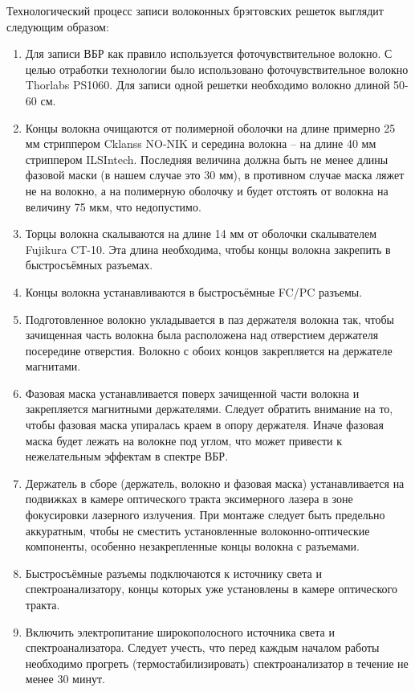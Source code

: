 Технологический процесс записи волоконных брэгговских решеток выглядит следующим образом:
\begin{enumerate}
    \item Для записи ВБР как правило используется фоточувствительное волокно. С целью отработки технологии было использовано фоточувствительное волокно Thorlabs PS1060. Для записи одной решетки необходимо волокно длиной 50-60 см.
    \item Концы волокна очищаются от полимерной оболочки на длине примерно 25 мм стриппером Cklanss NO-NIK и середина волокна – на длине 40 мм стриппером ILSIntech. Последняя величина должна быть не менее длины фазовой маски (в нашем случае это 30 мм), в противном случае маска ляжет не на волокно, а на полимерную оболочку и будет отстоять от волокна на величину 75 мкм, что недопустимо.
    \item Торцы волокна скалываются на длине 14 мм от оболочки скалывателем Fujikura CT-10. Эта длина необходима, чтобы концы волокна закрепить в быстросъёмных разъемах.
    \item Концы волокна устанавливаются в быстросъёмные FC/PC разъемы.
    \item Подготовленное волокно укладывается в паз держателя волокна так, чтобы зачищенная часть волокна была расположена над отверстием держателя посередине отверстия. Волокно с обоих концов закрепляется на держателе магнитами.
    \item Фазовая маска устанавливается поверх зачищенной части волокна и закрепляется магнитными держателями. Следует обратить внимание на то, чтобы фазовая маска упиралась краем в опору держателя. Иначе фазовая маска будет лежать на волокне под углом, что может привести к нежелательным эффектам в спектре ВБР.
    \item Держатель в сборе (держатель, волокно и фазовая маска) устанавливается на подвижках в камере оптического тракта эксимерного лазера в зоне фокусировки лазерного излучения. При монтаже следует быть предельно аккуратным, чтобы не сместить установленные волоконно-оптические компоненты, особенно незакрепленные концы волокна с разъемами.
    \item Быстросъёмные разъемы подключаются к источнику света и спектроанализатору, концы которых уже установлены в камере оптического тракта.
    \item Включить электропитание широкополосного источника света и спектроанализатора. Следует учесть, что перед каждым началом работы необходимо прогреть (термостабилизировать) спектроанализатор в течение не менее 30 минут.

\end{enumerate}
